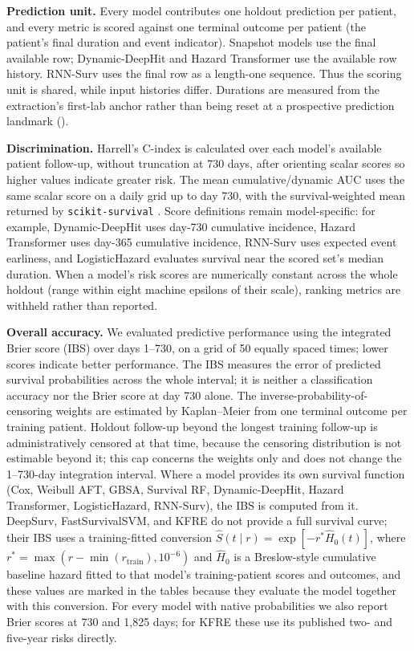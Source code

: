 \documentclass[10pt,letterpaper]{article}
\begin{document}
\textbf{Prediction unit.} Every model contributes one holdout prediction per patient, and every metric is scored against one terminal outcome per patient (the patient's final duration and event indicator). Snapshot models use the final available row; Dynamic-DeepHit and Hazard Transformer use the available row history. RNN-Surv uses the final row as a length-one sequence. Thus the scoring unit is shared, while input histories differ. Durations are measured from the extraction's first-lab anchor rather than being reset at a prospective prediction landmark ().

\textbf{Discrimination.} Harrell's C-index is calculated over each model's available patient follow-up, without truncation at 730 days, after orienting scalar scores so higher values indicate greater risk. The mean cumulative/dynamic AUC uses the same scalar score on a daily grid up to day 730, with the survival-weighted mean returned by \texttt{scikit-survival} \cite{polsterl2020sksurv}. Score definitions remain model-specific: for example, Dynamic-DeepHit uses day-730 cumulative incidence, Hazard Transformer uses day-365 cumulative incidence, RNN-Surv uses expected event earliness, and LogisticHazard evaluates survival near the scored set's median duration. When a model's risk scores are numerically constant across the whole holdout (range within eight machine epsilons of their scale), ranking metrics are withheld rather than reported.

\textbf{Overall accuracy.} We evaluated predictive performance using the integrated Brier score (IBS) over days 1--730, on a grid of 50 equally spaced times; lower scores indicate better performance. The IBS measures the error of predicted survival probabilities across the whole interval; it is neither a classification accuracy nor the Brier score at day 730 alone. The inverse-probability-of-censoring weights are estimated by Kaplan--Meier from one terminal outcome per training patient. Holdout follow-up beyond the longest training follow-up is administratively censored at that time, because the censoring distribution is not estimable beyond it; this cap concerns the weights only and does not change the 1--730-day integration interval. Where a model provides its own survival function (Cox, Weibull AFT, GBSA, Survival RF, Dynamic-DeepHit, Hazard Transformer, LogisticHazard, RNN-Surv), the IBS is computed from it. DeepSurv, FastSurvivalSVM, and KFRE do not provide a full survival curve; their IBS uses a training-fitted conversion $\hat S(t\mid r)=\exp[-r^*\hat H_0(t)]$, where $r^*=\max(r-\min(r_{\mathrm{train}}),10^{-6})$ and $\hat H_0$ is a Breslow-style cumulative baseline hazard fitted to that model's training-patient scores and outcomes, and these values are marked in the tables because they evaluate the model together with this conversion. For every model with native probabilities we also report Brier scores at 730 and 1{,}825 days; for KFRE these use its published two- and five-year risks directly.
\end{document}
